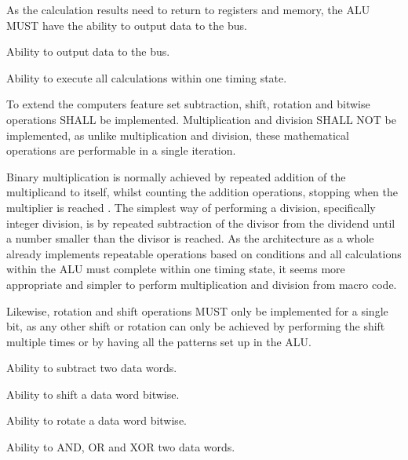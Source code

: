 As the calculation results need to return to registers and memory, the ALU MUST have the ability to output data to the bus.
\begin{arch-requirement}
  Ability to output data to the bus. 
\end{arch-requirement}

\begin{arch-requirement}
  Ability to execute all calculations within one timing state.
\end{arch-requirement}

To extend the computers feature set subtraction, shift, rotation and bitwise operations SHALL be implemented. Multiplication and division SHALL NOT be implemented, as unlike multiplication and division, these mathematical operations are performable in a single iteration. 

Binary multiplication is normally achieved by repeated addition of the multiplicand to itself, whilst counting the addition operations, stopping when the multiplier is reached \cite{cit.needed}. The simplest way of performing a division, specifically integer division, is by repeated subtraction of the divisor from the dividend until a number smaller than the divisor is reached.
As the architecture as a whole already implements repeatable operations based on conditions and all calculations within the ALU must complete within one timing state, it seems more appropriate and simpler to perform multiplication and division from macro code. 

Likewise, rotation and shift operations MUST only be implemented for a single bit, as any other shift or rotation can only be achieved by performing the shift multiple times or by having all the patterns set up in the ALU. %

\begin{feat-requirement}
  Ability to subtract two data words.
\end{feat-requirement}

\begin{feat-requirement}
  Ability to shift a data word bitwise.
\end{feat-requirement}

\begin{feat-requirement}
  Ability to rotate a data word bitwise.
\end{feat-requirement}

\begin{feat-requirement}
  Ability to AND, OR and XOR two data words.
\end{feat-requirement}


